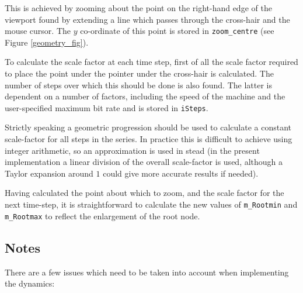 \documentclass{article}
\begin{document}
This is achieved by zooming about the point on the right-hand edge of the viewport found by extending a line which passes through the cross-hair and the mouse cursor. The $y$ co-ordinate of this point is stored in {\tt zoom\_centre} (see Figure \ref{geometry_fig}).

To calculate the scale factor at each time step, first of all the scale factor required to place the point under the pointer under the cross-hair is calculated. The number of steps over which this should be done is also found. The latter is dependent on a number of factors, including the speed of the machine and the user-specified maximum bit rate and is stored in {\tt iSteps}.

Strictly speaking a geometric progression should be used to calculate a constant scale-factor for all steps in the series. In practice this is difficult to achieve using integer arithmetic, so an approximation is used in stead (in the present implementation a linear division of the overall scale-factor is used, although a Taylor expansion around $1$ could give more accurate results if needed).

Having calculated the point about which to zoom, and the scale factor for the next time-step, it is straightforward to calculate the new values of {\tt m\_Rootmin} and {\tt m\_Rootmax} to reflect the enlargement of the root node.

\subsection{Notes}

There are a few issues which need to be taken into account when implementing the dynamics:
\end{document}

